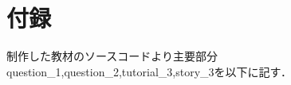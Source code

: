 
\newpage
\section*{付録}

制作した教材のソースコードより主要部分question\_1,question\_2,tutorial\_3,story\_3を以下に記す．
%


 

\newpage


\newpage


\newpage




